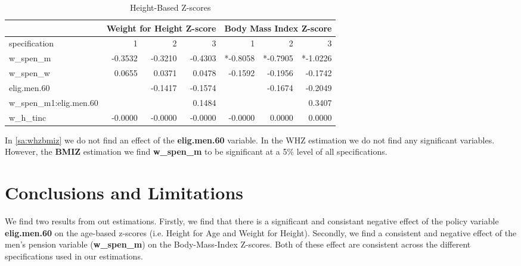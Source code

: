 \begin{refsection}
\begin{table}[!ht]
\centering
\caption{Height-Based Z-scores}
\label{sa:whzbmiz}
\begin{tabular}{l|rrr|rrr}
& \multicolumn{3}{c}{Weight for Height Z-score} & \multicolumn{3}{c}{Body Mass Index Z-score}\\
\hline
specification & 1 & 2 & 3 & 1 & 2 & 3 \\
\hline
w\_spen\_m &  -0.3532 & -0.3210 & -0.4303 & *-0.8058 & *-0.7905 & *-1.0226 \\
w\_spen\_w & 0.0655 & 0.0371 & 0.0478 & -0.1592 & -0.1956 & -0.1742 \\
elig.men.60 & & -0.1417 & -0.1574 & & -0.1674 & -0.2049 \\
w\_spen\_m1:elig.men.60 & & & 0.1484 & & & 0.3407 \\
w\_h\_tinc & -0.0000 & -0.0000 & -0.0000 & -0.0000 & 0.0000 & 0.0000
\end{tabular}
\end{table}


In \autoref{sa:whzbmiz} we do not find an effect of the \textbf{elig.men.60} variable.
In the WHZ estimation we do not find any significant variables.
However, the \textbf{BMIZ} estimation we find \textbf{w\_spen\_m} to be significant at a 5\% level of all specifications.


\section{Conclusions and Limitations}
We find two results from out estimations.
Firstly, we find that there is a significant and consistant negative effect of the policy variable \textbf{elig.men.60} on the age-based z-scores
(i.e. Height for Age and Weight for Height).
Secondly, we find a consistent and negative effect of the men's pension variable (\textbf{w\_spen\_m}) on the Body-Mass-Index Z-scores.
Both of these effect are consistent across the different specifications used in our estimations.







\printbibliography
\end{refsection}